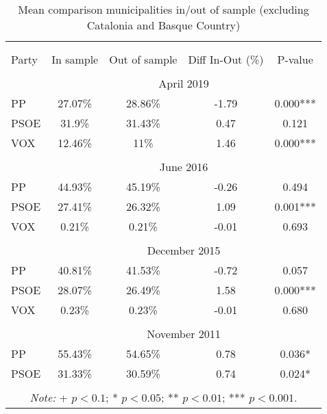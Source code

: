 \begin{table}[!htbp] \centering
\caption{Mean comparison municipalities in/out of sample (excluding Catalonia and Basque Country)}
\label{tab:ttest_sample_exclEC}
\small
\begin{tabular}{lcccc}
\\[-1.8ex]\hline
\hline \\[-1.8ex]
\\[-1.8ex]
Party & In sample & Out of sample & Diff In-Out (\%) & P-value \\
\hline \\[-1.8ex]
& \multicolumn{4}{c}{April 2019}\\
PP & 27.07\% & 28.86\% & -1.79 & 0.000*** \\
PSOE & 31.9\% & 31.43\% & 0.47 & 0.121 \\
VOX & 12.46\% & 11\% & 1.46 & 0.000*** \\
\hline \\[-1.8ex]
& \multicolumn{4}{c}{June 2016}\\
PP & 44.93\% & 45.19\% & -0.26 & 0.494 \\
PSOE & 27.41\% & 26.32\% & 1.09 & 0.001*** \\
VOX & 0.21\% & 0.21\% & -0.01 & 0.693 \\
\hline \\[-1.8ex]
& \multicolumn{4}{c}{December 2015}\\
PP & 40.81\% & 41.53\% & -0.72 & 0.057 \\
PSOE & 28.07\% & 26.49\% & 1.58 & 0.000*** \\
VOX & 0.23\% & 0.23\% & -0.01 & 0.680 \\
\hline \\[-1.8ex]
& \multicolumn{4}{c}{November 2011}\\
PP & 55.43\% & 54.65\% & 0.78 & 0.036* \\
PSOE & 31.33\% & 30.59\% & 0.74 & 0.024* \\
\hline
\hline \\[-1.8ex]
\multicolumn{5}{c}{\parbox[t]{0.65\textwidth}{\textit{Note:} + $p<0.1$; * $p<0.05$; ** $p<0.01$; *** $p<0.001$.}}\\
\end{tabular}
\end{table}
